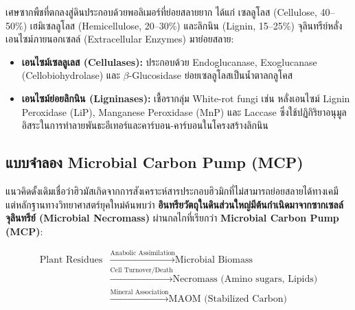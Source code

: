 เศษซากพืชที่ตกลงสู่ดินประกอบด้วยพอลิเมอร์ที่ย่อยสลายยาก ได้แก่ เซลลูโลส (Cellulose, 40--50\%) เฮมิเซลลูโลส (Hemicellulose, 20--30\%) และลิกนิน (Lignin, 15--25\%) จุลินทรีย์หลั่งเอนไซม์ภายนอกเซลล์ (Extracellular Enzymes) มาย่อยสลาย:

\begin{itemize}
    \item \textbf{เอนไซม์เซลลูเลส (Cellulases):} ประกอบด้วย Endoglucanase, Exoglucanase (Cellobiohydrolase) และ $\beta$-Glucosidase ย่อยเซลลูโลสเป็นน้ำตาลกลูโคส
    \item \textbf{เอนไซม์ย่อยลิกนิน (Ligninases):} เชื้อรากลุ่ม White-rot fungi เช่น  หลั่งเอนไซม์ Lignin Peroxidase (LiP), Manganese Peroxidase (MnP) และ Laccase ซึ่งใช้ปฏิกิริยาอนุมูลอิสระในการทำลายพันธะอีเทอร์และคาร์บอน-คาร์บอนในโครงสร้างลิกนิน
\end{itemize}

\subsection{แบบจำลอง Microbial Carbon Pump (MCP)}

แนวคิดดั้งเดิมเชื่อว่าฮิวมัสเกิดจากการสังเคราะห์สารประกอบฮิวมิกที่ไม่สามารถย่อยสลายได้ทางเคมี แต่หลักฐานทางวิทยาศาสตร์ยุคใหม่ค้นพบว่า \textbf{อินทรียวัตถุในดินส่วนใหญ่มีต้นกำเนิดมาจากซากเซลล์จุลินทรีย์ (Microbial Necromass)} ผ่านกลไกที่เรียกว่า \textbf{Microbial Carbon Pump (MCP)}:

\begin{equation}
\begin{split}
\text{Plant Residues} &\xrightarrow{\text{Anabolic Assimilation}} \text{Microbial Biomass} \\
&\xrightarrow{\text{Cell Turnover/Death}} \text{Necromass (Amino sugars, Lipids)} \\
&\xrightarrow{\text{Mineral Association}} \text{MAOM (Stabilized Carbon)}
\end{split}
\end{equation}

